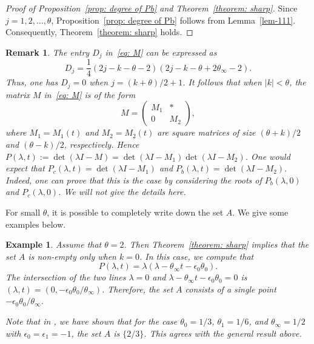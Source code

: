 \documentclass[pdftex]{sigma}
\numberwithin{equation}{section}
\newtheorem{Example}[Theorem]{Example}
\newtheorem{Remark}[Theorem]{Remark} }
\def\M#1#2#3#4{\begin{pmatrix}#1&#2\\#3&#4\end{pmatrix}}
\begin{document}
\begin{proof}[Proof of Proposition~\ref{prop: degree of Pb} and Theorem~\ref{theorem: sharp}] Since $j=1,2,\dots, \theta$, Proposition~\ref{prop: degree of Pb} follows from Lemma~\ref{lem-111}. Consequently, Theorem~\ref{theorem: sharp} holds.
\end{proof}

\begin{Remark} The entry $D_j$ in~\eqref{eq: M} can be expressed as
\[
 D_j=\frac14(2j-k-\theta-2)(2j-k-\theta+2\theta_\infty-2).
\]
 Thus, one has $D_j=0$ when $j=(k+\theta)/2+1$. It follows that when
 $|k|<\theta$, the matrix $M$ in~\eqref{eq: M} is of the form
\[
M=\M{M_1}*0{M_2},
\]
 where $M_1=M_1(t)$ and $M_2=M_2(t)$ are square matrices of size
 $(\theta+k)/2$ and $(\theta-k)/2$, respectively.
 Hence $P(\lambda,t):=\det(\lambda I-M)=\det(\lambda I-M_1)
 \det(\lambda I-M_2)$. One would expect that
 $P_c(\lambda,t)=\det(\lambda I-M_1)$ and
 $P_b(\lambda,t)=\det(\lambda I-M_2)$. Indeed, one can prove that
 this is the case by considering the roots of $P_b(\lambda,0)$
 and $P_c(\lambda,0)$. We will not give the details here.
\end{Remark}

For small $\theta$, it is possible to completely write down the set
$A$. We give some examples below.

\begin{Example}\label{example1} Assume that $\theta=2$. Then Theorem~\ref{theorem: sharp} implies that the set $A$ is non-empty
 only when $k=0$. In this case, we compute that
\[
 P(\lambda,t)=\lambda(\lambda-\theta_\infty t-\epsilon_0\theta_0).
\]
 The intersection of the two lines $\lambda=0$ and
 $\lambda-\theta_\infty t-\epsilon_0\theta_0=0$ is $(\lambda,t)
 =(0,-\epsilon_0\theta_0/\theta_\infty)$. Therefore, the set $A$
 consists of a single point $-\epsilon_0\theta_0/\theta_\infty$.

 Note that in \cite[Example 5.5]{Chen-Lin-Yang}, we have shown that
 for the case $\theta_0=1/3$, $\theta_1=1/6$, and
 $\theta_\infty=1/2$ with $\epsilon_0=\epsilon_1=-1$, the
 set $A$ is $\{2/3\}$. This agrees with the general result above.
\end{Example}
\end{document}
